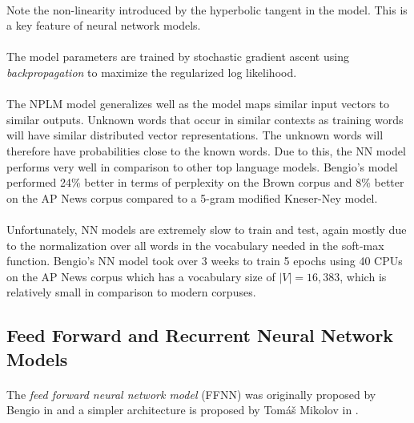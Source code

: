 \paragraph{}
Note the non-linearity introduced by the hyperbolic tangent in the model. This is a key feature of neural network models.
\paragraph{}
The model parameters are trained by stochastic gradient ascent using \emph{backpropagation} to maximize the regularized log likelihood. 
\paragraph{}
The NPLM model generalizes well as the model maps similar input vectors to similar outputs. Unknown words that occur in similar contexts as training words will have similar distributed vector representations. The unknown words will therefore have probabilities close to the known words.  Due to this, the NN model performs very well in comparison to other top language models. Bengio's model performed 24\% better in terms of perplexity on the Brown corpus and 8\% better on the AP News corpus compared to a 5-gram modified Kneser-Ney model.
\paragraph{}
Unfortunately, NN models are extremely slow to train and test, again mostly due to the normalization over all words in the vocabulary needed in the soft-max function. Bengio's NN model took over 3 weeks to train 5 epochs using 40 CPUs on the AP News corpus which has a vocabulary size of $|V|=16,383$, which is relatively small in comparison to modern corpuses.

\subsection{Feed Forward and Recurrent Neural Network Models}
\paragraph{}
The \emph{feed forward neural network model} (FFNN) was originally proposed by Bengio in \cite{Bengio2003} and  a simpler architecture is proposed by Tom{\'a}\v{s} Mikolov in \cite{Mikolov2009}.

